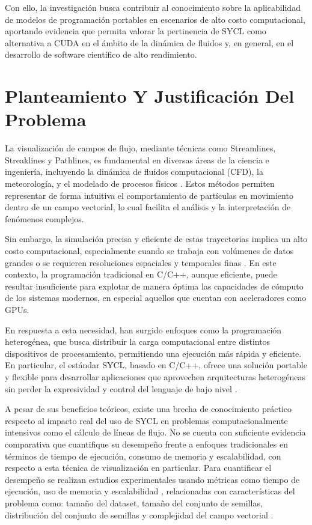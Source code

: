 \documentclass[12pt]{article}
\begin{document}
Con ello, la investigación busca contribuir al conocimiento sobre la aplicabilidad de modelos de programación portables en escenarios de alto costo computacional, aportando evidencia que permita valorar la pertinencia de SYCL como alternativa a CUDA en el ámbito de la dinámica de fluidos y, en general, en el desarrollo de software científico de alto rendimiento.


\section{Planteamiento Y Justificación Del Problema}

La visualización de campos de flujo, mediante técnicas como Streamlines, Streaklines y Pathlines, es fundamental en diversas áreas de la ciencia e ingeniería, incluyendo la dinámica de fluidos computacional (CFD), la meteorología, y el modelado de procesos físicos \cite{camp_streamline_2011}. Estos métodos permiten representar de forma intuitiva el comportamiento de partículas en movimiento dentro de un campo vectorial, lo cual facilita el análisis y la interpretación de fenómenos complejos.



Sin embargo, la simulación precisa y eficiente de estas trayectorias implica un alto costo computacional, especialmente cuando se trabaja con volúmenes de datos grandes o se requieren resoluciones espaciales y temporales finas \cite{pugmire_scalable_2009}. En este contexto, la programación tradicional en C/C++, aunque eficiente, puede resultar insuficiente para explotar de manera óptima las capacidades de cómputo de los sistemas modernos, en especial aquellos que cuentan con aceleradores como GPUs.



En respuesta a esta necesidad, han surgido enfoques como la programación heterogénea, que busca distribuir la carga computacional entre distintos dispositivos de procesamiento, permitiendo una ejecución más rápida y eficiente. En particular, el estándar SYCL, basado en C/C++, ofrece una solución portable y flexible para desarrollar aplicaciones que aprovechen arquitecturas heterogéneas sin perder la expresividad y control del lenguaje de bajo nivel \cite{keryell_sycl_2019}.


A pesar de sus beneficios teóricos, existe una brecha de conocimiento práctico respecto al impacto real del uso de SYCL en problemas computacionalmente intensivos como el cálculo de líneas de flujo. No se cuenta con suficiente evidencia comparativa que cuantifique su desempeño frente a enfoques tradicionales en términos de tiempo de ejecución, consumo de memoria y escalabilidad, con respecto a esta técnica de visualización en particular. Para cuantificar el desempeño se realizan estudios experimentales usando métricas como tiempo de ejecución, uso de memoria y escalabilidad \cite{camp_gpu_2013}, relacionadas con características del problema como: tamaño del dataset, tamaño del conjunto de semillas, distribución del conjunto de semillas y complejidad del campo vectorial \cite{camp_streamline_2011}.
\end{document}
